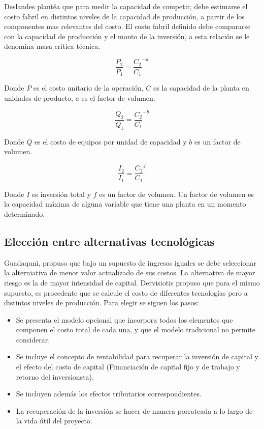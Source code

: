 \documentclass[a4paper, 11pt, oneside]{article}
\begin{document}
Deslandes plantéa que para medir la capacidad de competir, debe estimarse el costo fabril en distintos niveles de la
capacidad de producción, a partir de los componentes mas relevantes del costo. El costo fabril definido debe 
compararse con la capacidad de producción y el monto de la inversión, a esta relación se le denomina masa crítica
técnica.

	\[\frac{P_2}{P_1} = \frac{C_2}{C_1}^{-a} \]

Donde $P$ es el costo unitario de la operación, $C$ es la capacidad de la planta en unidades de producto, $a$ es el
factor de volumen.

	\[ \frac{Q_2}{Q_1} = \frac{C_2}{C_1}^{-b} \]

Donde $Q$ es el costo de equipos por unidad de capacidad y $b$ es un factor de volumen.

	\[ \frac{I_2}{I_1} = \frac{C_2}{C_1}^{f} \]

Donde $I$ es inversión total y $f$ es un factor de volumen. Un factor de volumen es la capacidad máxima de alguna 
variable que tiene una planta en un momento determinado.

\subsection{Elección entre alternativas tecnológicas}

Guadaquni, propuso que bajo un supuesto de ingresos iguales se debe seleccionar la alterniativa de menor valor
actualizado de sus costos. La alternativa de mayor riesgo es la de mayor intensidad de capital.
Dervisiotis propuso que para el mismo supuesto, es procedente que se calcule el costo de diferentes tecnologías
pero a distintos niveles de producción. Para elegir se siguen los pasos:

\begin{itemize}
	\item Se presenta el modelo opcional que incorpora todos los elementos que componen el costo total de cada una, y
	que el modelo tradicional no permite considerar. 
	\item Se incluye el concepto de rentabilidad para recuperar la inversión de capital y el efecto del costo 
	de capital (Financiación de capital fijo y de trabajo y retorno del inversionsta).
	\item Se incluyen además los efectos tributarios correspondientes. 
	\item La recuperación de la inversión se hacer de manera porrateada a lo largo de la vida útil del proyecto.
\end{itemize}
\end{document}
